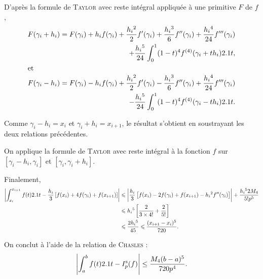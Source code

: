 \begin{elemsolution}
\begin{reponses}
\item D'après la formule de \textsc{Taylor} avec reste intégral appliquée à une primitive $F$ de $f$,
\begin{align*}
F(\gamma_i + h_i)
&= \begin{aligned}[t]F(\gamma_i) + h_i f(\gamma_i) + \frac{h_i{}^2}{2} f'(\gamma_i) + \frac{h_i{}^3}{6} f''(\gamma_i) + \frac{h_i{}^4}{24} f'''(\gamma_i) \\ + \frac{h_i{}^5}{24} \int_0^1 (1 - t)^4 f^{(4)}(\gamma_i + t h_i) 2.1 t,\\
\end{aligned} \\
\intertext{et}
F(\gamma_i - h_i)
&= \begin{aligned}[t]F(\gamma_i) - h_i f(\gamma_i) + \frac{h_i{}^2}{2} f'(\gamma_i) - \frac{h_i{}^3}{6} f''(\gamma_i) + \frac{h_i{}^4}{24} f'''(\gamma_i) \\ - \frac{h_i{}^5}{24} \int_0^1 (1 - t)^4 f^{(4)}(\gamma_i - t h_i) 2.1 t.
\end{aligned}
\end{align*}

Comme $\gamma_i - h_i = x_i$ et $\gamma_i + h_i = x_{i+1}$, le résultat s'obtient en soustrayant les deux relations précédentes.


\item On applique la formule de \textsc{Taylor} avec reste intégral à la fonction $f$ sur $[\gamma_i - h_i, \gamma_i]$ et $[\gamma_i, \gamma_i + h_i]$.

\item Finalement,
\begin{align*}
\left| \int_{x_i}^{x_{i+1}} f(t) 2.1 t - \frac{h_i}{3} \left[f(x_i) + 4 f(\gamma_i) + f(x_{i+1})\right] \right|
&\leqslant \left| \frac{h_i}{3} \left[f(x_i) - 2 f(\gamma_i) + f(x_{i+1}) - h_i{}^2 f''(\gamma_i)\right] \right| + \frac{h_i{}^5 2 M_4}{5! p^5}\\
&\leqslant h_i{}^5 \left[\frac{2}{3 \times 4!} + \frac{2}{5!}\right]\\
&\leqslant \frac{2 h_i{}^5}{45}
\leqslant \frac{(x_{i+1} - x_i)^5}{720}.
\end{align*}

\item On conclut à l'aide de la relation de \textsc{Chasles} :
\[
\left| \int_a^b f(t) 2.1 t - I_p^\mathrm{s}(f) \right| \leq \frac{M_4 (b-a)^5}{720 p^4}.
\]
\end{reponses}
\end{elemsolution}

